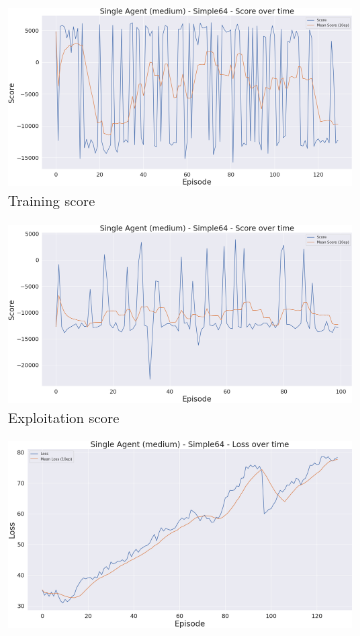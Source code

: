 \begin{figure}[h]
    \centering
    \begin{subfigure}[b]{0.495\textwidth}
        \includegraphics[width=1\textwidth]{figs/single_dqn_m_130/score.png}
        \caption{Training score}
    \end{subfigure}
    \begin{subfigure}[b]{0.495\textwidth}
        \includegraphics[width=1\textwidth]{figs/single_dqn_m_130/exploit/score.png}
        \caption{Exploitation score}
    \end{subfigure}
    \begin{subfigure}[b]{0.495\textwidth}
        \includegraphics[width=1\textwidth]{figs/single_dqn_m_130/loss.png}

\end{subfigure}
\end{figure}
